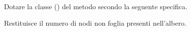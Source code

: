 Dotare la classe  () del metodo  secondo la seguente specifica.

\begin{methodslist}

 {
Restituisce il numero di nodi non foglia presenti nell'albero.
}

\end{methodslist}